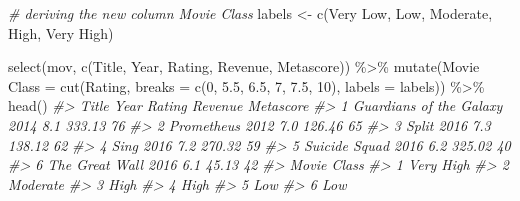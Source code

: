 \documentclass[
]{book}
\newenvironment{Shaded}{\begin{snugshade}}{\end{snugshade}}
\newcommand{\AttributeTok}[1]{\textcolor[rgb]{0.77,0.63,0.00}{#1}}
\newcommand{\CommentTok}[1]{\textcolor[rgb]{0.56,0.35,0.01}{\textit{#1}}}
\newcommand{\DecValTok}[1]{\textcolor[rgb]{0.00,0.00,0.81}{#1}}
\newcommand{\FloatTok}[1]{\textcolor[rgb]{0.00,0.00,0.81}{#1}}
\newcommand{\FunctionTok}[1]{\textcolor[rgb]{0.00,0.00,0.00}{#1}}
\newcommand{\NormalTok}[1]{#1}
\newcommand{\OtherTok}[1]{\textcolor[rgb]{0.56,0.35,0.01}{#1}}
\newcommand{\SpecialCharTok}[1]{\textcolor[rgb]{0.00,0.00,0.00}{#1}}
\newcommand{\StringTok}[1]{\textcolor[rgb]{0.31,0.60,0.02}{#1}}
\begin{document}
\begin{Shaded}
\begin{Highlighting}[]
\CommentTok{\# deriving the new column Movie Class}
\NormalTok{labels }\OtherTok{\textless{}{-}} \FunctionTok{c}\NormalTok{(}\StringTok{\textquotesingle{}Very Low\textquotesingle{}}\NormalTok{, }\StringTok{\textquotesingle{}Low\textquotesingle{}}\NormalTok{, }\StringTok{\textquotesingle{}Moderate\textquotesingle{}}\NormalTok{, }\StringTok{\textquotesingle{}High\textquotesingle{}}\NormalTok{, }\StringTok{\textquotesingle{}Very High\textquotesingle{}}\NormalTok{)}

\FunctionTok{select}\NormalTok{(mov, }\FunctionTok{c}\NormalTok{(}\StringTok{\textquotesingle{}Title\textquotesingle{}}\NormalTok{, }\StringTok{\textquotesingle{}Year\textquotesingle{}}\NormalTok{, }\StringTok{\textquotesingle{}Rating\textquotesingle{}}\NormalTok{, }\StringTok{\textquotesingle{}Revenue\textquotesingle{}}\NormalTok{, }\StringTok{\textquotesingle{}Metascore\textquotesingle{}}\NormalTok{)) }\SpecialCharTok{\%\textgreater{}\%}
  \FunctionTok{mutate}\NormalTok{(}\StringTok{\textasciigrave{}}\AttributeTok{Movie Class}\StringTok{\textasciigrave{}} \OtherTok{=} \FunctionTok{cut}\NormalTok{(Rating, }\AttributeTok{breaks =} \FunctionTok{c}\NormalTok{(}\DecValTok{0}\NormalTok{, }\FloatTok{5.5}\NormalTok{, }\FloatTok{6.5}\NormalTok{, }\DecValTok{7}\NormalTok{, }\FloatTok{7.5}\NormalTok{, }\DecValTok{10}\NormalTok{), }
                           \AttributeTok{labels =}\NormalTok{ labels)) }\SpecialCharTok{\%\textgreater{}\%}
  \FunctionTok{head}\NormalTok{()}
\CommentTok{\#\textgreater{}                     Title Year Rating Revenue Metascore}
\CommentTok{\#\textgreater{} 1 Guardians of the Galaxy 2014    8.1  333.13        76}
\CommentTok{\#\textgreater{} 2              Prometheus 2012    7.0  126.46        65}
\CommentTok{\#\textgreater{} 3                   Split 2016    7.3  138.12        62}
\CommentTok{\#\textgreater{} 4                    Sing 2016    7.2  270.32        59}
\CommentTok{\#\textgreater{} 5           Suicide Squad 2016    6.2  325.02        40}
\CommentTok{\#\textgreater{} 6          The Great Wall 2016    6.1   45.13        42}
\CommentTok{\#\textgreater{}   Movie Class}
\CommentTok{\#\textgreater{} 1   Very High}
\CommentTok{\#\textgreater{} 2    Moderate}
\CommentTok{\#\textgreater{} 3        High}
\CommentTok{\#\textgreater{} 4        High}
\CommentTok{\#\textgreater{} 5         Low}
\CommentTok{\#\textgreater{} 6         Low}


\end{Highlighting}
\end{Shaded}
\end{document}
